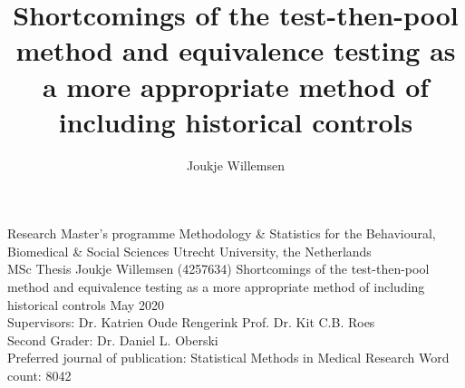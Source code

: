 \documentclass[Royal,sagev,times]{sagej}
\begin{document}
\begin{large}

{\selectfont

\:
\:

\noindent Research Master’s programme \newline
Methodology \& Statistics for the Behavioural,  Biomedical \& Social Sciences \newline
Utrecht University, the Netherlands \\[4\baselineskip]

\noindent MSc Thesis Joukje Willemsen (4257634) \newline
Shortcomings of the test-then-pool method and equivalence testing as a more appropriate method of including historical controls \newline
May 2020 \\[4\baselineskip]

\noindent Supervisors: \newline
Dr. Katrien Oude Rengerink \newline
Prof. Dr. Kit C.B. Roes \\[2\baselineskip]

\noindent Second Grader: \newline
Dr. Daniel L. Oberski \\[4\baselineskip]

\noindent Preferred journal of publication: Statistical Methods in Medical Research \newline
Word count: 8042
}

\end{large}

\newpage 

% 


\title{Shortcomings of the test-then-pool method and equivalence testing as a more appropriate method of including historical controls}


\author{Joukje Willemsen }%

\\
\end{document}

